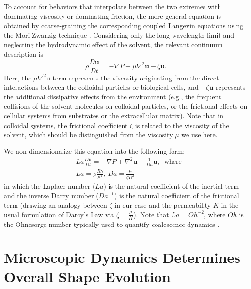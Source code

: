 \documentclass[%
reprint,
amsmath,amssymb,
aps,
]{revtex4-2}
\begin{document}
	
	To account for behaviors that interpolate between the two extremes with dominating viscosity or dominating friction, the more general equation is obtained by coarse-graining the corresponding coupled Langevin equations using the Mori-Zwanzig technique \cite{hessGeneralizedHydrodynamicsSystems1983,evansStatisticalMechanicsNonequilibrium2007}. Considering only the long-wavelength limit and neglecting the hydrodynamic effect of the solvent, the relevant continuum description is
	\begin{equation}
		\rho\frac{D\textbf{u}}{Dt}=-\nabla P+\mu \nabla^2\textbf{u}-\zeta\textbf{u}.
		\label{equ:gNS}
	\end{equation}  
	Here, the $\mu\nabla^2\textbf{u}$ term represents the viscosity originating from the direct interactions between the colloidal particles or biological cells, and $-\zeta\textbf{u}$ represents the additional dissipative effects from the environment (e.g., the frequent collisions of the solvent molecules on colloidal particles, or the frictional effects on cellular systems from substrates or the extracellular matrix). Note that in colloidal systems, the frictional coefficient $\zeta$ is related to the viscosity of the solvent, which should be distinguished from the viscosity $\mu$ we use here.  
	
	We non-dimensionalize this equation into the following form:
	\begin{equation}\label{eq:nonDimGNS}
		\begin{aligned}
			&La\frac{D\textbf{u}}{Dt}= -\nabla P+\nabla^2\textbf{u} -\frac{1}{Da}\textbf{u},\  \textrm{ where}\\
			&La=\rho\frac{R\gamma}{\mu^2}\textrm{,\ \  } Da=\frac{\mu}{\zeta R^2} 
		\end{aligned}
	\end{equation}
	in which the Laplace number ($La$) is the natural coefficient of the inertial term and the inverse Darcy number ($Da^{-1}$) is the natural coefficient of the frictional term (drawing an analogy between $\zeta$ in our case and the permeability $K$ in the usual formulation of Darcy's Law via $\zeta=\frac{\mu}{K}$). Note that $La=Oh^{-2}$, where $Oh$ is the Ohnesorge number typically used to quantify coalescence dynamics \cite{paulsenInexorableResistanceInertia2012a}.
	
	
	\section{Microscopic Dynamics Determines Overall Shape Evolution}
	\label{sec:shape}
	
\end{document}
